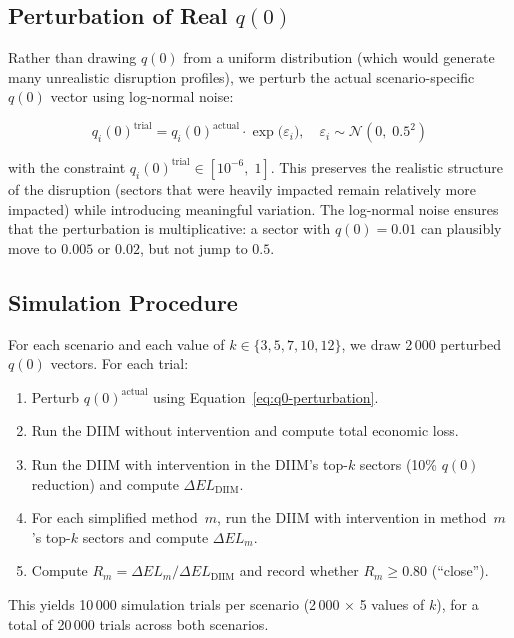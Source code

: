 \subsection{Perturbation of Real $q(0)$}

Rather than drawing $q(0)$ from a uniform distribution (which would generate many unrealistic disruption profiles), we perturb the actual scenario-specific $q(0)$ vector using log-normal noise:

\begin{equation}
    q_i(0)^{\text{trial}} = q_i(0)^{\text{actual}} \cdot \exp\!\bigl(\varepsilon_i\bigr), \quad \varepsilon_i \sim \mathcal{N}(0,\; 0.5^2)
    \label{eq:q0-perturbation}
\end{equation}

\noindent with the constraint $q_i(0)^{\text{trial}} \in [10^{-6},\; 1]$. This preserves the realistic structure of the disruption (sectors that were heavily impacted remain relatively more impacted) while introducing meaningful variation. The log-normal noise ensures that the perturbation is multiplicative: a sector with $q(0) = 0.01$ can plausibly move to $0.005$ or $0.02$, but not jump to $0.5$.

\subsection{Simulation Procedure}

For each scenario and each value of $k \in \{3, 5, 7, 10, 12\}$, we draw 2\,000 perturbed $q(0)$ vectors. For each trial:

\begin{enumerate}
    \item Perturb $q(0)^{\text{actual}}$ using Equation~\eqref{eq:q0-perturbation}.
    \item Run the DIIM without intervention and compute total economic loss.
    \item Run the DIIM with intervention in the DIIM's top-$k$ sectors (10\% $q(0)$ reduction) and compute $\Delta EL_{\text{DIIM}}$.
    \item For each simplified method~$m$, run the DIIM with intervention in method~$m$'s top-$k$ sectors and compute $\Delta EL_m$.
    \item Compute $R_m = \Delta EL_m / \Delta EL_{\text{DIIM}}$ and record whether $R_m \geq 0.80$ (``close'').
\end{enumerate}

This yields 10\,000 simulation trials per scenario (2\,000 $\times$ 5 values of $k$), for a total of 20\,000 trials across both scenarios.


